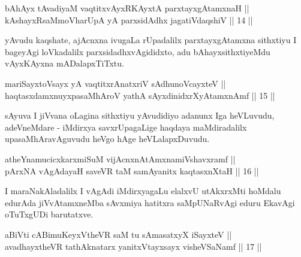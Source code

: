 
\begin{shl}
bAhAyx tAvadiyaM vaqtitxvAyxRKAyxtA parxtayxgAtamxnaH || \\
kAshayxRsaMmoVharUpA yA parxsidAdhx jagatiVdaqshiV \hfill || 14 ||
  
\end{shl}

\begin{artha}
yAvudu kaqshate, ajAcnxna ivugaLa rUpadalilx parxtayxgAtamxna
sithxtiyu I bageyAgi loVkadalilx parxsidadhxvAgididxto, adu
bAhayxsithxtiyeMdu vAyxKAyxna mADalapxTiTxtu.
\end{artha}


\begin{shl}
mariSayxtoV\s sayx yA vaqtitxrAnatxriV sA\s dhunoVcayxteV ||  \\
haqtasxdamxnuyxpasaMhAroV yathA sAyxdinidxrXyAtamxnAmf \hfill || 15 ||
  
\end{shl}

\begin{artha}
sAyuva I jiVvana oLagina sithxtiyu yAvudidiyo adanunx Iga heVLuvudu,
adeVneMdare - iMdirxya savxrUpagaLige haqdaya maMdiradalilx
upasaMhAravAguvudu heVgo hAge heVLalapxDuvudu.
\end{artha}


\begin{shl}
atheYnamucicxkarxmiSuM vijAcnxnAtAmxnamiVshavxramf || \\
pArxNA vAgAdayaH saveVR taM samAyanitx kaqtasxnXtaH \hfill || 16 ||
  
\end{shl}

\begin{artha}
I maraNakAladalilx I vAgAdi iMdirxyagaLu elalxvU utAkxrxMti hoMdalu
edurAda jiVvAtamxneMba sAvxmiya hatitxra saMpUNaRvAgi eduru EkavAgi
oTuTxgUDi barutatxve.
\end{artha}


\begin{shl}
aBiVti cA\s \s BimuKeyxV\s theVR saM tu sAmasatxyX iSayxteV ||  \\
avadhayxtheVR tathA\s \s knatarx yanitxVtayxsayx visheVSaNamf \hfill || 17 ||
 
\end{shl}

